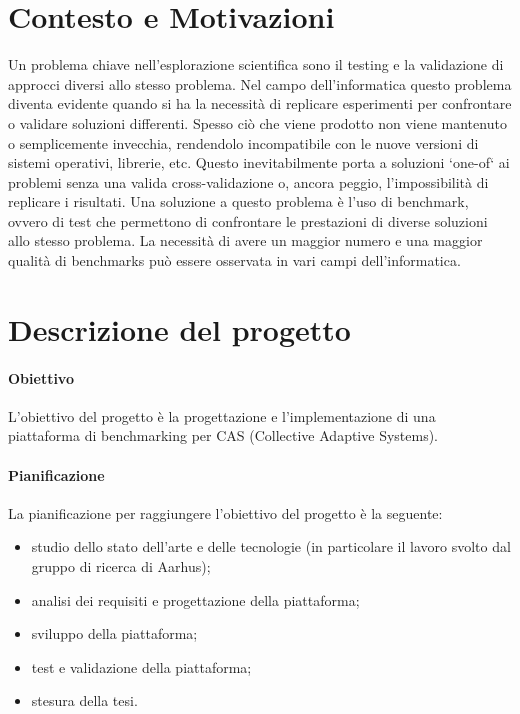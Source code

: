 \documentclass[12pt, a4paper]{article}
\begin{document}


\section{Contesto e Motivazioni} \label{sec:context}

Un problema chiave nell'esplorazione scientifica sono il testing e la validazione di approcci diversi allo stesso problema.
Nel campo dell'informatica questo problema diventa evidente quando si ha la necessità di replicare esperimenti
per confrontare o validare soluzioni differenti.
Spesso ciò che viene prodotto non viene mantenuto o semplicemente invecchia, rendendolo incompatibile con le nuove versioni
di sistemi operativi, librerie, etc.
Questo inevitabilmente porta a soluzioni `one-of` ai problemi senza una valida cross-validazione o, ancora peggio,
l'impossibilità di replicare i risultati.
Una soluzione a questo problema è l'uso di benchmark, ovvero di test che permettono di confrontare le prestazioni di
diverse soluzioni allo stesso problema.
La necessità di avere un maggior numero e una maggior qualità di benchmarks può essere osservata in vari campi dell'informatica.

\section{Descrizione del progetto}

\paragraph{Obiettivo}

L'obiettivo del progetto è la progettazione e l'implementazione di una piattaforma di benchmarking per CAS (Collective Adaptive Systems).

\paragraph{Pianificazione}

La pianificazione per raggiungere l'obiettivo del progetto è la seguente:
\begin{itemize}
    \item studio dello stato dell'arte e delle tecnologie (in particolare il lavoro svolto dal gruppo di ricerca di Aarhus);
    \item analisi dei requisiti e progettazione della piattaforma;
    \item sviluppo della piattaforma;
    \item test e validazione della piattaforma;
    \item stesura della tesi.
\end{itemize}
\end{document}
